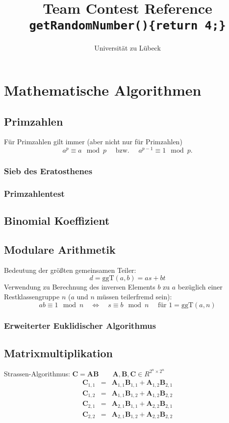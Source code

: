 \documentclass[10pt,a4paper,ngerman]{article}
\title{Team Contest Reference\\ \texttt{getRandomNumber()\{return 4;\}}}
\author{Universität zu Lübeck}
\begin{document}
\lstset{basicstyle=\ttfamily\footnotesize,numbers=left,numberstyle=\tiny,tabsize=2,numbersep=5pt}
\maketitle\thispagestyle{fancy}

\tableofcontents

\section{Mathematische Algorithmen}
\subsection{Primzahlen}
Für Primzahlen gilt immer (aber nicht nur für Primzahlen)
\[a^p\equiv a\mod p \quad\text{ bzw. }\quad a^{p-1}\equiv 1 \mod p.\]
\subsubsection{Sieb des Eratosthenes}

\subsubsection{Primzahlentest}

\subsection{Binomial Koeffizient}

\subsection{Modulare Arithmetik}
Bedeutung der größten gemeinsamen Teiler:
\[ d = \text{ggT}(a,b) = as+bt \]
Verwendung zu Berechnung des inversen Elements $b$ zu $a$ bezüglich einer Restklassengruppe $n$ ($a$ und $n$ müssen teilerfremd sein):
\[ ab\equiv 1 \mod n\quad\Leftrightarrow\quad s\equiv b \mod n\quad\text{ für }1=\text{ggT}(a,n)\]
\subsubsection{Erweiterter Euklidischer Algorithmus}

\subsection{Matrixmultiplikation}
Strassen-Algorithmus: $\mathbf{C} = \mathbf{A} \mathbf{B} \qquad \mathbf{A},\mathbf{B},\mathbf{C} \in R^{2^n \times 2^n}$
\begin{eqnarray*}
\mathbf{C}_{1,1} & =& \mathbf{A}_{1,1} \mathbf{B}_{1,1} + \mathbf{A}_{1,2} \mathbf{B}_{2,1} \\
\mathbf{C}_{1,2} &=& \mathbf{A}_{1,1} \mathbf{B}_{1,2} + \mathbf{A}_{1,2} \mathbf{B}_{2,2}\\
\mathbf{C}_{2,1} &=& \mathbf{A}_{2,1} \mathbf{B}_{1,1} + \mathbf{A}_{2,2} \mathbf{B}_{2,1} \\
\mathbf{C}_{2,2} &=& \mathbf{A}_{2,1} \mathbf{B}_{1,2} + \mathbf{A}_{2,2} \mathbf{B}_{2,2}
\end{eqnarray*}
\end{document}
